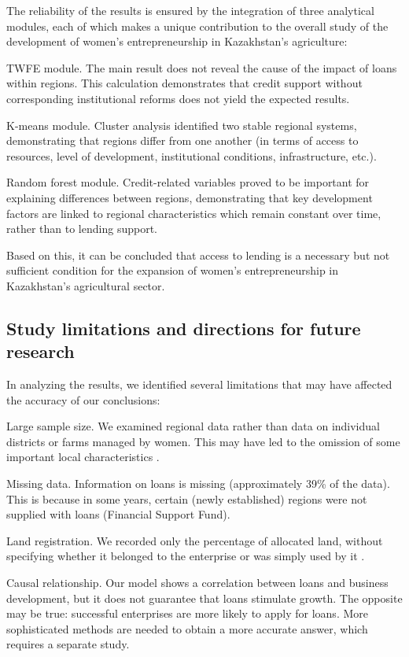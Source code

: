 ﻿\documentclass[pdflatex,sn-mathphys-ay]{sn-jnl}
\begin{document}
The reliability of the results is ensured by the integration of three
analytical modules, each of which makes a unique contribution to the
overall study of the development of women's entrepreneurship in
Kazakhstan's agriculture:

TWFE module. The main result does not reveal the cause of the impact of
loans within regions. This calculation demonstrates that credit support
without corresponding institutional reforms does not yield the expected
results.

K-means module. Cluster analysis identified two stable regional systems,
demonstrating that regions differ from one another (in terms of access
to resources, level of development, institutional conditions,
infrastructure, etc.).

Random forest module. Credit-related variables proved to be important
for explaining differences between regions, demonstrating that key
development factors are linked to regional characteristics which remain
constant over time, rather than to lending support.

Based on this, it can be concluded that access to lending is a necessary
but not sufficient condition for the expansion of women's
entrepreneurship in Kazakhstan's agricultural sector.

\subsection{Study limitations and directions for future research}

In analyzing the results, we identified several limitations that may
have affected the accuracy of our conclusions:

Large sample size. We examined regional data rather than data on
individual districts or farms managed by women. This may have led to the
omission of some important local characteristics \citep{ref36}.

Missing data. Information on loans is missing (approximately 39\% of the
data). This is because in some years, certain (newly established)
regions were not supplied with loans (Financial Support Fund).

Land registration. We recorded only the percentage of allocated land,
without specifying whether it belonged to the enterprise or was simply
used by it \citep{ref52}.

Causal relationship. Our model shows a correlation between loans and
business development, but it does not guarantee that loans stimulate
growth. The opposite may be true: successful enterprises are more likely
to apply for loans. More sophisticated methods are needed to obtain a
more accurate answer, which requires a separate study.
\end{document}
